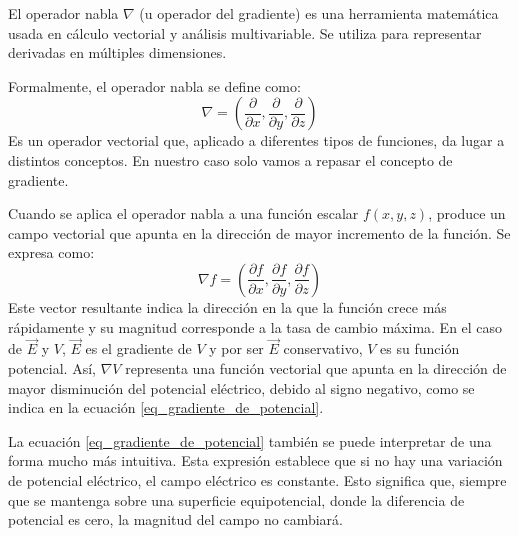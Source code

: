 \begin{tcolorbox}[interesting_data,title=Recordatorio]
El operador nabla \(\nabla\) (u operador del gradiente) es una herramienta matemática usada en cálculo vectorial y análisis multivariable. Se utiliza para representar derivadas en múltiples dimensiones.

Formalmente, el operador nabla se define como:
\[
\nabla = \left( \frac{\partial}{\partial x}, \frac{\partial}{\partial y}, \frac{\partial}{\partial z} \right)
\]
Es un operador vectorial que, aplicado a diferentes tipos de funciones, da lugar a distintos conceptos. En nuestro caso solo vamos a repasar el concepto de gradiente.

Cuando se aplica el operador nabla a una función escalar \( f(x, y, z) \), produce un campo vectorial que apunta en la dirección de mayor incremento de la función. Se expresa como:
\[
\nabla f = \left( \frac{\partial f}{\partial x}, \frac{\partial f}{\partial y}, \frac{\partial f}{\partial z} \right)
\]
Este vector resultante indica la dirección en la que la función crece más rápidamente y su magnitud corresponde a la tasa de cambio máxima. En el caso de \(\vec{E}\) y \(V\), \(\vec{E}\) es el gradiente de \(V\) y por ser \(\vec{E}\) conservativo, \(V\) es su función potencial. Así, \(\nabla V\) representa una función vectorial que apunta en la dirección de mayor disminución del potencial eléctrico, debido al signo negativo, como se indica en la ecuación \eqref{eq_gradiente_de_potencial}.
\end{tcolorbox}

La ecuación \eqref{eq_gradiente_de_potencial} también se puede interpretar de una forma mucho más intuitiva. Esta expresión establece que si no hay una variación de potencial eléctrico, el campo eléctrico es constante. Esto significa que, siempre que se mantenga sobre una superficie equipotencial, donde la diferencia de potencial es cero, la magnitud del campo no cambiará.

